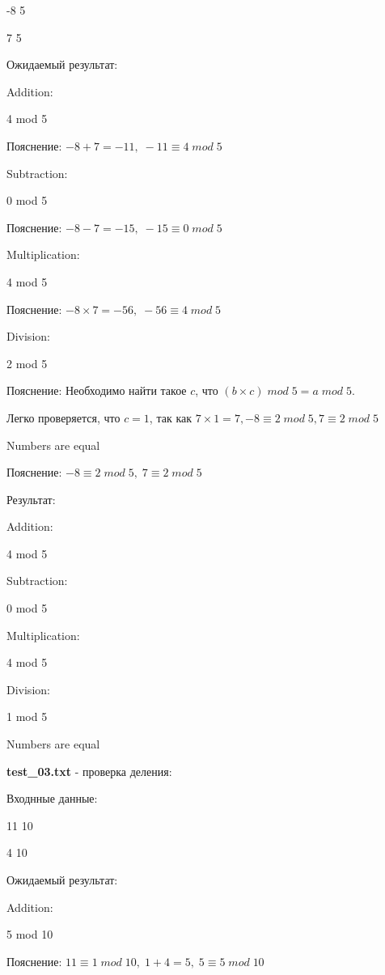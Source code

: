 \documentclass[a4paper, 12pt]{article}
\begin{document}
-8 5

7 5

\vspace{3ex}

Ожидаемый результат:

Addition:

4 mod 5

Пояснение: $ -8 + 7 = -11,\; -11 \equiv 4\;mod\;5 $

Subtraction:

0 mod 5

Пояснение: $ -8 - 7 = -15,\; -15 \equiv 0\;mod\;5 $

Multiplication:

4 mod 5

Пояснение: $ -8 \times 7 = -56,\; -56 \equiv 4\;mod\;5 $

Division:

2 mod 5

Пояснение: Необходимо найти такое $ c $, что $ (b \times c)\;mod\;5 = a\;mod\;5 $.

Легко проверяется, что $ c = 1 $, так как $ 7 \times 1 = 7, -8 \equiv 2\;mod\;5, 7 \equiv 2\;mod\;5 $

Numbers are equal

Пояснение: $-8 \equiv 2\;mod\;5,\;7 \equiv 2\;mod\;5$

\vspace{3ex}

Результат:

Addition:

4 mod 5

Subtraction:

0 mod 5

Multiplication:

4 mod 5

Division:

1 mod 5

Numbers are equal

\vspace{3ex}

\textbf{test\_03.txt} - проверка деления:


Входнные данные:

11 10

4 10

\vspace{3ex}

Ожидаемый результат:

Addition:

5 mod 10

Пояснение: $11 \equiv 1\;mod\;10,\;1 + 4 = 5,\; 5 \equiv 5\;mod\;10 $
\end{document}
